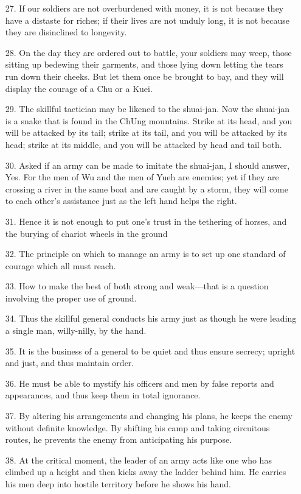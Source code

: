 \documentclass[11pt,openany]{memoir}
\newcommand{\enumeratemargin}{1.30em}
\begin{document}
\begin{enumerate}[leftmargin=\enumeratemargin]
\item[27.] If our soldiers are not overburdened with money, it is not because they have a distaste for riches; if their lives are not unduly long, it is not because they are disinclined to longevity.
\item[28.] On the day they are ordered out to battle, your soldiers may weep, those sitting up bedewing their garments, and those lying down letting the tears run down their cheeks. But let them once be brought to bay, and they will display the courage of a Chu or a Kuei.
\item[29.] The skillful tactician may be likened to the shuai-jan. Now the shuai-jan is a snake that is found in the ChUng mountains. Strike at its head, and you will be attacked by its tail; strike at its tail, and you will be attacked by its head; strike at its middle, and you will be attacked by head and tail both.
\item[30.] Asked if an army can be made to imitate the shuai-jan, I should answer, Yes. For the men of Wu and the men of Yueh are enemies; yet if they are crossing a river in the same boat and are caught by a storm, they will come to each other's assistance just as the left hand helps the right.
\item[31.] Hence it is not enough to put one's trust in the tethering of horses, and the burying of chariot wheels in the ground
\item[32.] The principle on which to manage an army is to set up one standard of courage which all must reach.
\item[33.] How to make the best of both strong and weak---that is a question involving the proper use of ground.
\item[34.] Thus the skillful general conducts his army just as though he were leading a single man, willy-nilly, by the hand.
\item[35.] It is the business of a general to be quiet and thus ensure secrecy; upright and just, and thus maintain order.
\item[36.] He must be able to mystify his officers and men by false reports and appearances, and thus keep them in total ignorance.
\item[37.] By altering his arrangements and changing his plans, he keeps the enemy without definite knowledge. By shifting his camp and taking circuitous routes, he prevents the enemy from anticipating his purpose.
\item[38.] At the critical moment, the leader of an army acts like one who has climbed up a height and then kicks away the ladder behind him. He carries his men deep into hostile territory before he shows his hand.

\end{enumerate}
\end{document}
